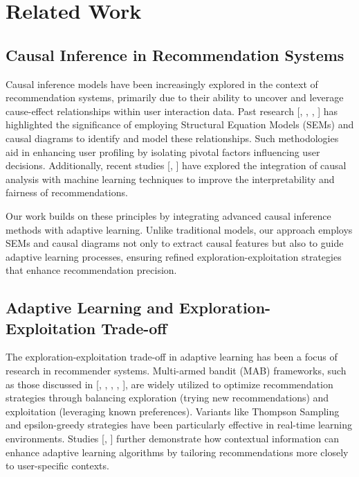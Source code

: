 \section{Related Work}

\subsection{Causal Inference in Recommendation Systems}

Causal inference models have been increasingly explored in the context of recommendation systems, primarily due to their ability to uncover and leverage cause-effect relationships within user interaction data. Past research [\cite{Pearl2009Causality}, \cite{Shmueli2010Explanatory}, \cite{Spirtes2000Causal}, \cite{Peters2017Elements}] has highlighted the significance of employing Structural Equation Models (SEMs) and causal diagrams to identify and model these relationships. Such methodologies aid in enhancing user profiling by isolating pivotal factors influencing user decisions. Additionally, recent studies [\cite{Louizos2017Causal}, \cite{Yao2021Debiased}] have explored the integration of causal analysis with machine learning techniques to improve the interpretability and fairness of recommendations.

Our work builds on these principles by integrating advanced causal inference methods with adaptive learning. Unlike traditional models, our approach employs SEMs and causal diagrams not only to extract causal features but also to guide adaptive learning processes, ensuring refined exploration-exploitation strategies that enhance recommendation precision.

\subsection{Adaptive Learning and Exploration-Exploitation Trade-off}

The exploration-exploitation trade-off in adaptive learning has been a focus of research in recommender systems. Multi-armed bandit (MAB) frameworks, such as those discussed in [\cite{Gittins2011Multi}, \cite{Auer2002Using}, \cite{Vermorel2005Multi}, \cite{Russo2018Tutorial}, \cite{Bubeck2012Regret}], are widely utilized to optimize recommendation strategies through balancing exploration (trying new recommendations) and exploitation (leveraging known preferences). Variants like Thompson Sampling and epsilon-greedy strategies have been particularly effective in real-time learning environments. Studies [\cite{Zhou2015Survey}, \cite{Li2010Contextual}] further demonstrate how contextual information can enhance adaptive learning algorithms by tailoring recommendations more closely to user-specific contexts.

